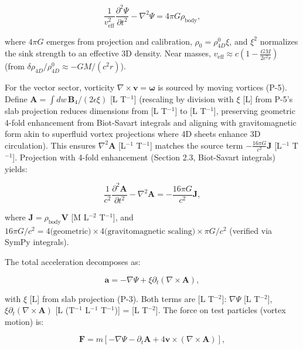 \begin{equation}
\frac{1}{v_{\text{eff}}^2} \frac{\partial^2 \Psi}{\partial t^2} - \nabla^2 \Psi = 4\pi G \rho_{\text{body}},
\end{equation}

where $4\pi G$ emerges from projection and calibration, $\rho_0 = \rho_{4D}^0 \xi$, and $\xi^2$ normalizes the sink strength to an effective 3D density. Near masses, $v_{\text{eff}} \approx c \left(1 - \frac{G M}{2 c^2 r}\right)$ (from $\delta \rho_{4D} / \rho_{4D}^0 \approx - G M / (c^2 r)$).

For the vector sector, vorticity $\nabla \times \mathbf{v} = \boldsymbol{\omega}$ is sourced by moving vortices (P-5). Define $\mathbf{A} = \int dw \, \mathbf{B}_4 / (2\epsilon \xi)$ [L T$^{-1}$] (rescaling by division with $\xi$ [L] from P-5's slab projection reduces dimensions from [L T$^{-1}$] to [L T$^{-1}$], preserving geometric 4-fold enhancement from Biot-Savart integrals and aligning with gravitomagnetic form akin to superfluid vortex projections where 4D sheets enhance 3D circulation). This ensures $\nabla^2 \mathbf{A}$ [L$^{-1}$ T$^{-1}$] matches the source term $-\frac{16\pi G}{c^2} \mathbf{J}$ [L$^{-1}$ T$^{-1}$]. Projection with 4-fold enhancement (Section 2.3, Biot-Savart integrals) yields:

\begin{equation}
\frac{1}{c^2} \frac{\partial^2 \mathbf{A}}{\partial t^2} - \nabla^2 \mathbf{A} = -\frac{16\pi G}{c^2} \mathbf{J},
\end{equation}

where $\mathbf{J} = \rho_{\text{body}} \mathbf{V}$ [M L$^{-2}$ T$^{-1}$], and $16\pi G/c^2 = 4 \text{(geometric)} \times 4 \text{(gravitomagnetic scaling)} \times \pi G/c^2$ (verified via SymPy integrals).

The total acceleration decomposes as:

\begin{equation}
\mathbf{a} = -\nabla \Psi + \xi \partial_t (\nabla \times \mathbf{A}),
\end{equation}

with $\xi$ [L] from slab projection (P-3). Both terms are [L T$^{-2}$]: $\nabla \Psi$ [L T$^{-2}$], $\xi \partial_t (\nabla \times \mathbf{A})$ [L (T$^{-1}$ L$^{-1}$ T$^{-1}$)] = [L T$^{-2}$]. The force on test particles (vortex motion) is:

\begin{equation}
\mathbf{F} = m \left[ -\nabla \Psi - \partial_t \mathbf{A} + 4 \mathbf{v} \times (\nabla \times \mathbf{A}) \right],
\end{equation}

